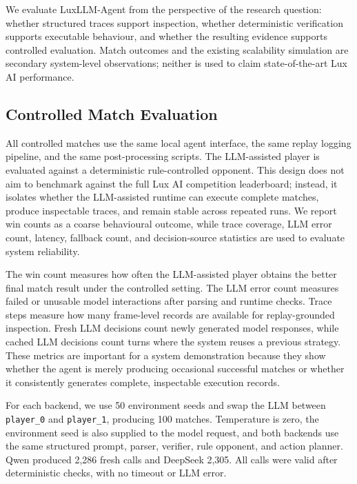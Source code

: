 \documentclass[11pt]{article}
\begin{document}
We evaluate LuxLLM-Agent from the perspective of the research question: whether structured traces support inspection, whether deterministic verification supports executable behaviour, and whether the resulting evidence supports controlled evaluation. Match outcomes and the existing scalability simulation are secondary system-level observations; neither is used to claim state-of-the-art Lux AI performance.

\subsection{Controlled Match Evaluation}

All controlled matches use the same local agent interface, the same replay logging pipeline, and the same post-processing scripts. The LLM-assisted player is evaluated against a deterministic rule-controlled opponent. This design does not aim to benchmark against the full Lux AI competition leaderboard; instead, it isolates whether the LLM-assisted runtime can execute complete matches, produce inspectable traces, and remain stable across repeated runs. We report win counts as a coarse behavioural outcome, while trace coverage, LLM error count, latency, fallback count, and decision-source statistics are used to evaluate system reliability.

The win count measures how often the LLM-assisted player obtains the better final match result under the controlled setting. The LLM error count measures failed or unusable model interactions after parsing and runtime checks. Trace steps measure how many frame-level records are available for replay-grounded inspection. Fresh LLM decisions count newly generated model responses, while cached LLM decisions count turns where the system reuses a previous strategy. These metrics are important for a system demonstration because they show whether the agent is merely producing occasional successful matches or whether it consistently generates complete, inspectable execution records.

For each backend, we use 50 environment seeds and swap the LLM between \texttt{player\_0} and \texttt{player\_1}, producing 100 matches. Temperature is zero, the environment seed is also supplied to the model request, and both backends use the same structured prompt, parser, verifier, rule opponent, and action planner. Qwen produced 2,286 fresh calls and DeepSeek 2,305. All calls were valid after deterministic checks, with no timeout or LLM error.
\end{document}
